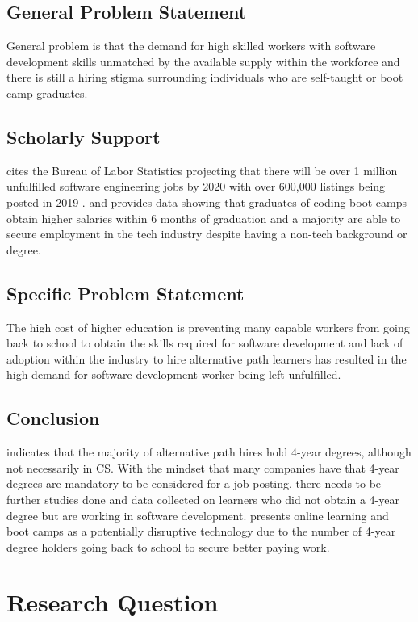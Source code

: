 \documentclass[
	letterpaper, %
]{jdf}
\begin{document}
\subsection{General Problem Statement}
General problem is that the demand for high skilled workers with software development skills unmatched by the available supply within the workforce and there is still a hiring stigma surrounding individuals who are self-taught or boot camp graduates.
\subsection{Scholarly Support}
\citep{12} cites the Bureau of Labor Statistics projecting that there will be over 1 million unfulfilled software engineering jobs by 2020 with over 600,000 listings being posted in 2019 \citep{15}. \citep{8} and \citep{6} provides data showing that graduates of coding boot camps obtain higher salaries within 6 months of graduation and a majority are able to secure employment in the tech industry despite having a non-tech background or degree.
\subsection{Specific Problem Statement}
The high cost of higher education is preventing many capable workers from going back to school to obtain the skills required for software development and lack of adoption within the industry to hire alternative path learners has resulted in the high demand for software development worker being left unfulfilled. 
\subsection{Conclusion}
\citep{7} indicates that the majority of alternative path hires hold 4-year degrees, although not necessarily in CS. With the mindset that many companies have that 4-year degrees are mandatory to be considered for a job posting, there needs to be further studies done and data collected on learners who did not obtain a 4-year degree but are working in software development. \citep{13} presents online learning and boot camps as a potentially disruptive technology due to the number of 4-year degree holders going back to school to secure better paying work. 

\section{Research Question}
\end{document}
